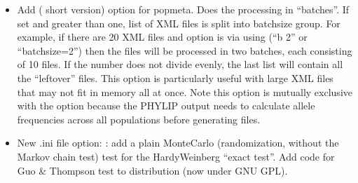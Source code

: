 \documentclass[letterpaper,10pt,english,openany,oneside]{sphinxmanual}
\begin{document}
\begin{itemize}
\item {} 
\sphinxAtStartPar
Add  ( short version) option  for popmeta.  Does the
processing in “batches”.  If set and greater than one, list of XML
files is split into batchsize group.  For example, if there are 20
XML files and option is via using (“\sphinxhyphen{}b 2” or “\textendash{}batchsize=2”) then
the files will be processed in two batches, each consisting of 10
files.  If the number does not divide evenly, the last list will
contain all the “left\sphinxhyphen{}over” files.  This option is particularly
useful with large XML files that may not fit in memory all at
once.  Note this option is mutually exclusive with the
 option because the PHYLIP output needs to
calculate allele frequencies across all populations before
generating files.

\item {} 
\sphinxAtStartPar
New .ini file option: \sphinxcode{\sphinxupquote{{[}HardyWeinbergGuoThompsonMonteCarlo{]}}}: add a plain
Monte\sphinxhyphen{}Carlo (randomization, without the Markov chain test) test
for the HardyWeinberg “exact test”.  Add code for Guo \& Thompson
test to distribution (now under GNU GPL).

\end{itemize}
\end{document}
